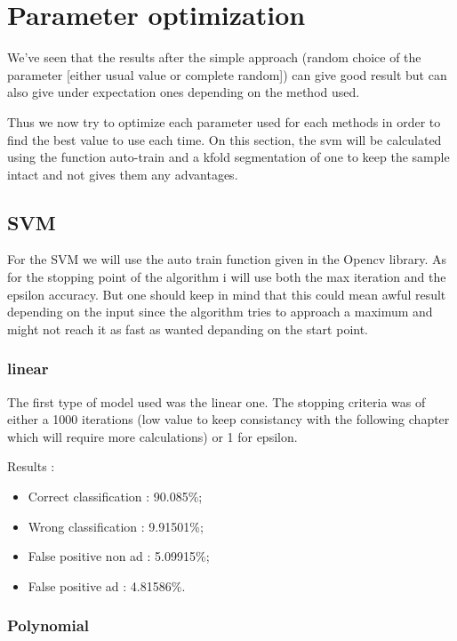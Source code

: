 \chapter{Parameter optimization}

We've seen that the results after the simple approach (random choice of the parameter [either usual value or complete random]) can give good result but can also give under expectation ones depending on the method used.

Thus we now try to optimize each parameter used for each methods in order to find the best value to use each time. On this section, the svm will be calculated using the function auto-train and a kfold segmentation of one to keep the sample intact and not gives them any advantages.

\section{SVM}

For the SVM we will use the auto train function given in the Opencv library. As for the stopping point of the algorithm i will use both the max iteration and the epsilon accuracy. But one should keep in mind that this could mean awful result depending on the input since the algorithm tries to approach a maximum and might not reach it as fast as wanted depanding on the start point.

\subsection{linear}

The first type of model used was the linear one. The stopping criteria was of either a 1000 iterations (low value to keep consistancy with the following chapter which will require more calculations) or 1 for epsilon.

Results :
\begin{itemize}
  \item Correct classification : 90.085\%;
  \item Wrong classification : 9.91501\%;
  \item False positive non ad : 5.09915\%;
  \item False positive ad : 4.81586\%.
\end{itemize}


\subsection{Polynomial}


